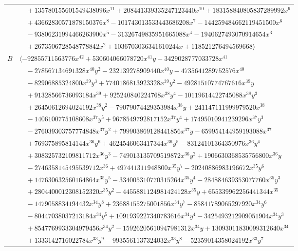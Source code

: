 \documentclass[11pt]{article}
\begin{document}
\begin{longtable}{@{}ll@{}}
 & $\quad +135780155601549438096x^{11}+208441339335247123440x^{10}+183158840805837289992x^{9}$\\
 & $\quad +43662830571878150376x^{8}-101743013533443686208x^{7}-144259484662119451500x^{6}$\\
 & $\quad -93806231994466263900x^{5}-31326749835951665088x^{4}-1940627493070914654x^{3}$\\
 & $\quad +2673506728548778842x^{2}+1036703036341610244x+118521276494569668\rangle$\\
$B$ & $\langle -92855711563776x^{42}+530604066078720x^{41}y-3429028777033728x^{41}$\\
 & $\quad -278567134691328x^{40}y^{2}-232139278909440x^{40}y-4735641289752576x^{40}$\\
 & $\quad -82906885324800x^{39}y^{3}+7740186813923328x^{39}y^{2}-49281510774767616x^{39}y$\\
 & $\quad +91328566736093184x^{39}+925240840224768x^{38}y^{4}-10119614422745088x^{38}y^{3}$\\
 & $\quad +26450612694024192x^{38}y^{2}-79079074429353984x^{38}y+241147111999979520x^{38}$\\
 & $\quad -1406100775108608x^{37}y^{5}+9678549792817152x^{37}y^{4}+17495010941239296x^{37}y^{3}$\\
 & $\quad -276039303757774848x^{37}y^{2}+799903869128441856x^{37}y-659954144959193088x^{37}$\\
 & $\quad +769375895814144x^{36}y^{6}+4624546063417344x^{36}y^{5}-83124101364350976x^{36}y^{4}$\\
 & $\quad +308325732109811712x^{36}y^{3}-749013135709519872x^{36}y^{2}+1906630368535756800x^{36}y$\\
 & $\quad -2746358145495539712x^{36}+497441311948800x^{35}y^{7}-20240886983196672x^{35}y^{6}$\\
 & $\quad +147630632560164864x^{35}y^{5}-334005310770315264x^{35}y^{4}-284884639353077760x^{35}y^{3}$\\
 & $\quad +2804400012308152320x^{35}y^{2}-4455881124981424128x^{35}y+655339962256441344x^{35}$\\
 & $\quad -1479058834194432x^{34}y^{8}+23688155275001856x^{34}y^{7}-85841789065297920x^{34}y^{6}$\\
 & $\quad -80447038037213184x^{34}y^{5}+1091939227340783616x^{34}y^{4}-3425493212909051904x^{34}y^{3}$\\
 & $\quad +8547769933304979456x^{34}y^{2}-15926205610947981312x^{34}y+13093011830099312640x^{34}$\\
 & $\quad +1333142716022784x^{33}y^{9}-9935561137324032x^{33}y^{8}-52359014358024192x^{33}y^{7}$\\

\end{longtable}
\end{document}
